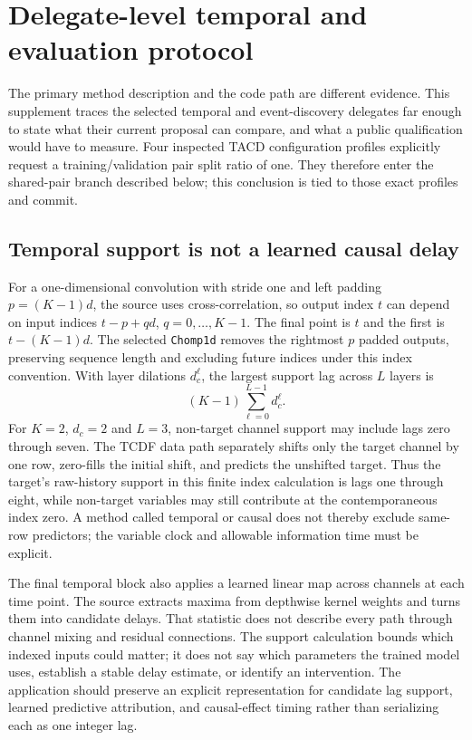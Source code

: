 \section[Delegate-level temporal and evaluation protocol]{Delegate-level temporal and evaluation protocol}
\label{sec:exec28-at2}
The primary method description and the code path are different evidence. This supplement traces
the selected temporal and event-discovery delegates far enough to state what their current
proposal can compare, and what a public qualification would have to measure. Four inspected TACD
configuration profiles explicitly request a training/validation pair split ratio of one. They
therefore enter the shared-pair branch described below; this conclusion is tied to those exact
profiles and commit.

\subsection{Temporal support is not a learned causal delay}
For a one-dimensional convolution with stride one and left padding $p=(K-1)d$, the source uses
cross-correlation, so output index $t$ can depend on input indices
$t-p+qd$, $q=0,\ldots,K-1$. The final point is $t$ and the first is $t-(K-1)d$.
The selected \texttt{Chomp1d} removes the rightmost $p$ padded outputs, preserving sequence
length and excluding future indices under this index convention. With layer dilations
$d_c^\ell$, the largest support lag across $L$ layers is
\[
  (K-1)\sum_{\ell=0}^{L-1}d_c^\ell.
\]
For $K=2$, $d_c=2$ and $L=3$, non-target channel support may include lags zero through seven.
The TCDF data path separately shifts only the target channel by one row, zero-fills the initial
shift, and predicts the unshifted target. Thus the target's raw-history support in this finite
index calculation is lags one through eight, while non-target variables may still contribute
at the contemporaneous index zero. A method called temporal or causal does not thereby exclude
same-row predictors; the variable clock and allowable information time must be explicit.
\citep{exec28_at_tcdf_temporal,exec28_at_protocol_reference}

The final temporal block also applies a learned linear map across channels at each time point.
The source extracts maxima from depthwise kernel weights and turns them into candidate delays.
That statistic does not describe every path through channel mixing and residual connections.
The support calculation bounds which indexed inputs could matter; it does not say which
parameters the trained model uses, establish a stable delay estimate, or identify an intervention.
The application should preserve an explicit representation for candidate lag support, learned
predictive attribution, and causal-effect timing rather than serializing each as one integer lag.
\citep{exec28_at_tcdf_temporal}

